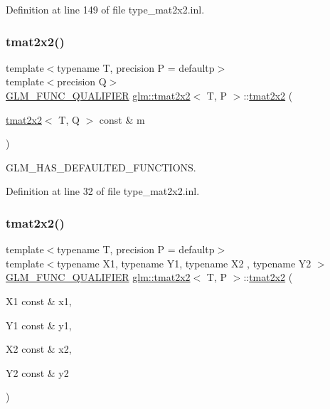 Definition at line 149 of file type\+\_\+mat2x2.\+inl.

\mbox{\label{structglm_1_1tmat2x2_a183612b4e6b8300c93d45dc3c1bb6ff2}} 
\subsubsection{\texorpdfstring{tmat2x2()}{tmat2x2()}\hspace{0.1cm}{\footnotesize\ttfamily [19/22]}}
{\footnotesize\ttfamily template$<$typename T, precision P = defaultp$>$ \\
template$<$precision Q$>$ \\
\mbox{\hyperlink{setup_8hpp_a33fdea6f91c5f834105f7415e2a64407}{G\+L\+M\+\_\+\+F\+U\+N\+C\+\_\+\+Q\+U\+A\+L\+I\+F\+I\+ER}} \mbox{\hyperlink{structglm_1_1tmat2x2}{glm\+::tmat2x2}}$<$ T, P $>$\+::\mbox{\hyperlink{structglm_1_1tmat2x2}{tmat2x2}} (\begin{DoxyParamCaption}\item[{\mbox{\hyperlink{structglm_1_1tmat2x2}{tmat2x2}}$<$ T, Q $>$ const \&}]{m }\end{DoxyParamCaption})}



G\+L\+M\+\_\+\+H\+A\+S\+\_\+\+D\+E\+F\+A\+U\+L\+T\+E\+D\+\_\+\+F\+U\+N\+C\+T\+I\+O\+NS. 



Definition at line 32 of file type\+\_\+mat2x2.\+inl.

\mbox{\label{structglm_1_1tmat2x2_a49088761b4a3aaef14400d8e5fc51bc8}} 
\subsubsection{\texorpdfstring{tmat2x2()}{tmat2x2()}\hspace{0.1cm}{\footnotesize\ttfamily [20/22]}}
{\footnotesize\ttfamily template$<$typename T, precision P = defaultp$>$ \\
template$<$typename X1, typename Y1, typename X2 , typename Y2 $>$ \\
\mbox{\hyperlink{setup_8hpp_a33fdea6f91c5f834105f7415e2a64407}{G\+L\+M\+\_\+\+F\+U\+N\+C\+\_\+\+Q\+U\+A\+L\+I\+F\+I\+ER}} \mbox{\hyperlink{structglm_1_1tmat2x2}{glm\+::tmat2x2}}$<$ T, P $>$\+::\mbox{\hyperlink{structglm_1_1tmat2x2}{tmat2x2}} (\begin{DoxyParamCaption}\item[{X1 const \&}]{x1,  }\item[{Y1 const \&}]{y1,  }\item[{X2 const \&}]{x2,  }\item[{Y2 const \&}]{y2 }\end{DoxyParamCaption})}



